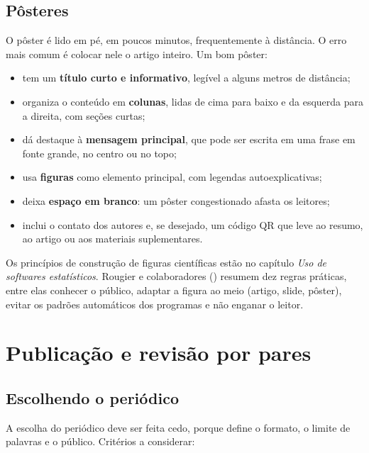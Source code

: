 \documentclass[
]{book}
\providecommand{\tightlist}{%
  \setlength{\itemsep}{0pt}\setlength{\parskip}{0pt}}
\begin{document}
\subsection{Pôsteres}\label{puxf4steres}

O pôster é lido em pé, em poucos minutos, frequentemente à distância. O erro mais comum é colocar nele o artigo inteiro. Um bom pôster:

\begin{itemize}
\tightlist
\item
  tem um \textbf{título curto e informativo}, legível a alguns metros de distância;
\item
  organiza o conteúdo em \textbf{colunas}, lidas de cima para baixo e da esquerda para a direita, com seções curtas;
\item
  dá destaque à \textbf{mensagem principal}, que pode ser escrita em uma frase em fonte grande, no centro ou no topo;
\item
  usa \textbf{figuras} como elemento principal, com legendas autoexplicativas;
\item
  deixa \textbf{espaço em branco}: um pôster congestionado afasta os leitores;
\item
  inclui o contato dos autores e, se desejado, um código QR que leve ao resumo, ao artigo ou aos materiais suplementares.
\end{itemize}

Os princípios de construção de figuras científicas estão no capítulo \emph{Uso de softwares estatísticos}. Rougier e colaboradores () resumem dez regras práticas, entre elas conhecer o público, adaptar a figura ao meio (artigo, slide, pôster), evitar os padrões automáticos dos programas e não enganar o leitor.

\section{Publicação e revisão por pares}\label{publicauxe7uxe3o-e-revisuxe3o-por-pares}

\subsection{Escolhendo o periódico}\label{escolhendo-o-periuxf3dico}

A escolha do periódico deve ser feita cedo, porque define o formato, o limite de palavras e o público. Critérios a considerar:
\end{document}

